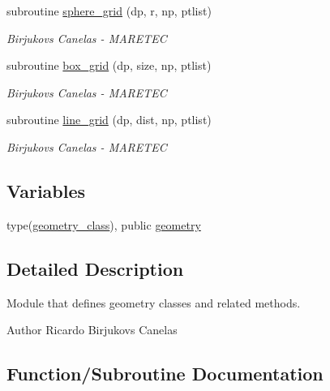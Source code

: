 \begin{DoxyCompactItemize}
subroutine \hyperlink{namespacegeometry__mod_a6c03a4ea3de6763940396dbeb3908ebc}{sphere\+\_\+grid} (dp, r, np, ptlist)
\begin{DoxyCompactList}\small\item\em Birjukovs Canelas -\/ M\+A\+R\+E\+T\+EC \end{DoxyCompactList}\item 
subroutine \hyperlink{namespacegeometry__mod_ae87e4ecff2d21a839da2b82919b5fd0b}{box\+\_\+grid} (dp, size, np, ptlist)
\begin{DoxyCompactList}\small\item\em Birjukovs Canelas -\/ M\+A\+R\+E\+T\+EC \end{DoxyCompactList}\item 
subroutine \hyperlink{namespacegeometry__mod_abcb09c0f5274c27cb79b0dd009ed94b3}{line\+\_\+grid} (dp, dist, np, ptlist)
\begin{DoxyCompactList}\small\item\em Birjukovs Canelas -\/ M\+A\+R\+E\+T\+EC \end{DoxyCompactList}\end{DoxyCompactItemize}
\subsection*{Variables}
\begin{DoxyCompactItemize}
\item 
type(\hyperlink{structgeometry__mod_1_1geometry__class}{geometry\+\_\+class}), public \hyperlink{namespacegeometry__mod_ad2ad4f7e1138beaad5f37d5c15b7b457}{geometry}
\end{DoxyCompactItemize}


\subsection{Detailed Description}
Module that defines geometry classes and related methods. 

\begin{DoxyAuthor}{Author}
Ricardo Birjukovs Canelas 
\end{DoxyAuthor}


\subsection{Function/\+Subroutine Documentation}
\mbox{\label{namespacegeometry__mod_a1b6f259b0b6be71e02ffae7670f7d8ba}} 
